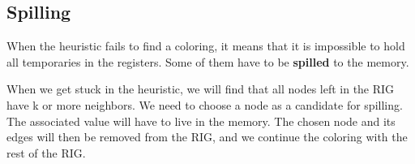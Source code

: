 \subsection{Spilling}
When the heuristic fails to find a coloring, it means that it is impossible to hold all temporaries in the registers. Some of them have to be \textbf{spilled} to the memory. 

When we get stuck in the heuristic, we will find that all nodes left in the RIG have k or more neighbors. We need to choose a node as a candidate for spilling. The associated value will have to live in the memory. The chosen node and its edges will then be removed from the RIG, and we continue the coloring with the rest of the RIG.
\ifx\PREAMBLE\undefined

\fi